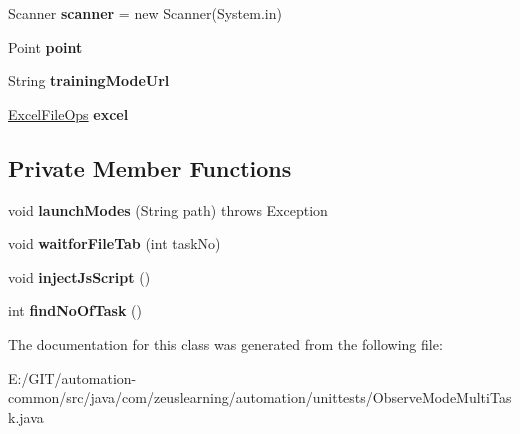 \begin{DoxyCompactItemize}
Scanner {\bfseries scanner} = new Scanner(System.\+in)
\item 
\hypertarget{classcom_1_1zeuslearning_1_1automation_1_1unittests_1_1ObserveModeMultiTask_a24ec050f54a8938719aea1f1eeb35ef1}{}\label{classcom_1_1zeuslearning_1_1automation_1_1unittests_1_1ObserveModeMultiTask_a24ec050f54a8938719aea1f1eeb35ef1} 
Point {\bfseries point}
\item 
\hypertarget{classcom_1_1zeuslearning_1_1automation_1_1unittests_1_1ObserveModeMultiTask_a7096f9fa6d28b862c2cff5a067e407a0}{}\label{classcom_1_1zeuslearning_1_1automation_1_1unittests_1_1ObserveModeMultiTask_a7096f9fa6d28b862c2cff5a067e407a0} 
String {\bfseries training\+Mode\+Url}
\item 
\hypertarget{classcom_1_1zeuslearning_1_1automation_1_1unittests_1_1ObserveModeMultiTask_a57c05b0b72864d9b4edfdaa1f80fffc7}{}\label{classcom_1_1zeuslearning_1_1automation_1_1unittests_1_1ObserveModeMultiTask_a57c05b0b72864d9b4edfdaa1f80fffc7} 
\hyperlink{classcom_1_1zeuslearning_1_1automation_1_1io_1_1ExcelFileOps}{Excel\+File\+Ops} {\bfseries excel}
\end{DoxyCompactItemize}
\subsection*{Private Member Functions}
\begin{DoxyCompactItemize}
\item 
\hypertarget{classcom_1_1zeuslearning_1_1automation_1_1unittests_1_1ObserveModeMultiTask_aad389b6292f4910f8e0511f9113e2986}{}\label{classcom_1_1zeuslearning_1_1automation_1_1unittests_1_1ObserveModeMultiTask_aad389b6292f4910f8e0511f9113e2986} 
void {\bfseries launch\+Modes} (String path)  throws Exception 
\item 
\hypertarget{classcom_1_1zeuslearning_1_1automation_1_1unittests_1_1ObserveModeMultiTask_a3fdf64e55e43911f9b476a1ca1ad5aab}{}\label{classcom_1_1zeuslearning_1_1automation_1_1unittests_1_1ObserveModeMultiTask_a3fdf64e55e43911f9b476a1ca1ad5aab} 
void {\bfseries waitfor\+File\+Tab} (int task\+No)
\item 
\hypertarget{classcom_1_1zeuslearning_1_1automation_1_1unittests_1_1ObserveModeMultiTask_a2d2d0debcd820c28ecbec3215201c505}{}\label{classcom_1_1zeuslearning_1_1automation_1_1unittests_1_1ObserveModeMultiTask_a2d2d0debcd820c28ecbec3215201c505} 
void {\bfseries inject\+Js\+Script} ()
\item 
\hypertarget{classcom_1_1zeuslearning_1_1automation_1_1unittests_1_1ObserveModeMultiTask_ae3d403d1edda2fafdf5e106ac8ff4bd7}{}\label{classcom_1_1zeuslearning_1_1automation_1_1unittests_1_1ObserveModeMultiTask_ae3d403d1edda2fafdf5e106ac8ff4bd7} 
int {\bfseries find\+No\+Of\+Task} ()
\end{DoxyCompactItemize}


The documentation for this class was generated from the following file\+:\begin{DoxyCompactItemize}
\item 
E\+:/\+G\+I\+T/automation-\/common/src/java/com/zeuslearning/automation/unittests/Observe\+Mode\+Multi\+Task.\+java\end{DoxyCompactItemize}
